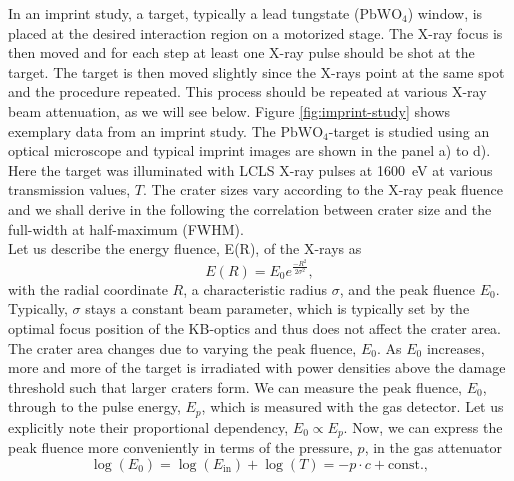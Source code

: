 %
In an imprint study, a target, typically a lead tungstate ($\text{PbWO}_{4}$) window, is placed at the desired interaction region on a motorized stage. The X-ray focus is then moved and for each step at least one X-ray pulse should be shot at the target. The target is then moved slightly since the X-rays point at the same spot and the procedure repeated. This process should be repeated at various X-ray beam attenuation, as we will see below. Figure \ref{fig:imprint-study} shows exemplary data from an imprint study. The $\text{PbWO}_{4}$-target is studied using an optical microscope and typical imprint images are shown in the panel a) to d). Here the target was illuminated with LCLS X-ray pulses at \SI{1600}{\electronvolt} at various transmission values, $T$. The crater sizes vary according to the X-ray peak fluence and we shall derive in the following the correlation between crater size and the full-width at half-maximum (FWHM).\\[1\baselineskip]
%
Let us describe the energy fluence, E(R), of the X-rays as
\begin{equation}
E(R) = E_{0} e^{\frac{-R^{2}}{2 \sigma^{2}}},
\end{equation}
with the radial coordinate $R$, a characteristic radius $\sigma$, and the peak fluence $E_{0}$. Typically, $\sigma$ stays a constant beam parameter, which is typically set by the optimal focus position of the KB-optics and thus does not affect the crater area. The crater area changes due to varying the peak fluence, $E_{0}$. As $E_{0}$ increases, more and more of the target is irradiated with power densities above the damage threshold such that larger craters form. We can measure the peak fluence, $E_{0}$, through to the pulse energy, $E_{p}$, which is measured with the gas detector. Let us explicitly note their proportional dependency, $E_{0}\propto E_{p}$. Now, we can express the peak fluence more conveniently in terms of the pressure, $p$, in the gas attenuator
\begin{equation}
\log(E_{0}) = \log(E_{\text{in}})+\log(T)= -p \cdot c + \text{const.},
\label{eq:gaussian-beam-imprint}
\end{equation}
